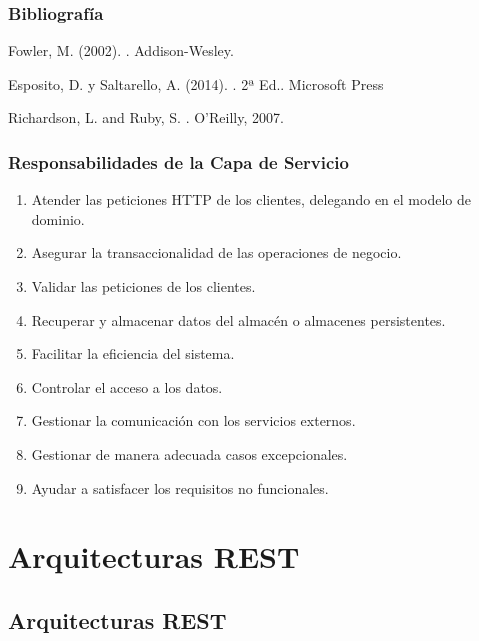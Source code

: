 \documentclass[handout,a4paper,slidestop,xcolor=pst,blue]{beamer}
\begin{document}
\begin{frame}[c]
    \frametitle{Bibliografía}
    \begin{thebibliography}{1}

        Fowler, M. (2002).
        .
        \newblock Addison-Wesley.

        Esposito, D. y Saltarello, A. (2014).
        . 2ª Ed..
        \newblock Microsoft Press

        Richardson, L. and Ruby, S.
        .
        \newblock  O'Reilly, 2007.

    \end{thebibliography}
\end{frame}

\begin{frame}[c]
	\frametitle{Responsabilidades de la Capa de Servicio}
	\begin{enumerate}[<+->]
        \item Atender las peticiones HTTP de los clientes, delegando en el modelo de dominio.
        \item Asegurar la transaccionalidad de las operaciones de negocio.
        \item Validar las peticiones de los clientes.
        \item Recuperar y almacenar datos del almacén o almacenes persistentes.
        \item Facilitar la eficiencia del sistema.
        \item Controlar el acceso a los datos.
        \item Gestionar la comunicación con los servicios externos.
        \item Gestionar de manera adecuada casos excepcionales.
        \item Ayudar a satisfacer los requisitos no funcionales.
	\end{enumerate}
\end{frame}

\section{Arquitecturas REST}

\subsection{Arquitecturas REST}
\end{document}
